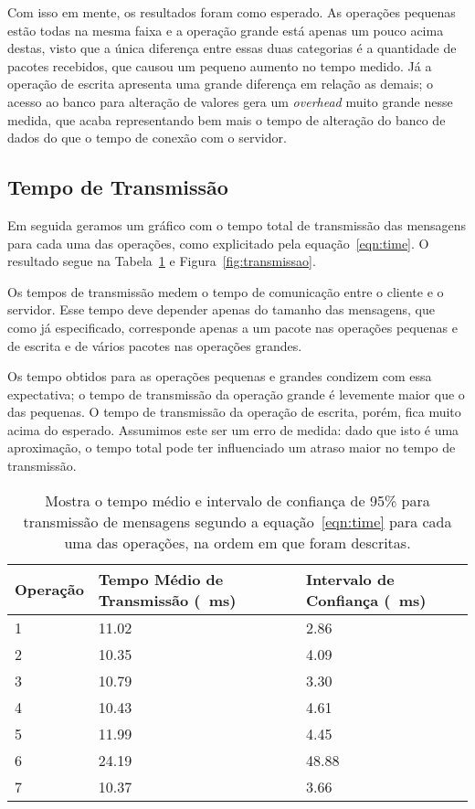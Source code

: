 \documentclass[12pt,a4paper]{article}
\begin{document}
Com isso em mente, os resultados foram como esperado. As operações pequenas estão todas na mesma faixa e a operação grande está apenas um pouco acima destas, visto que a única diferença entre essas duas categorias é a quantidade de pacotes recebidos, que causou um pequeno aumento no tempo medido. Já a operação de escrita apresenta uma grande diferença em relação as demais; o acesso ao banco para alteração de valores gera um {\it overhead} muito grande nesse medida, que acaba representando bem mais o tempo de alteração do banco de dados do que o tempo de conexão com o servidor.

\subsection{Tempo de Transmissão}

Em seguida geramos um gráfico com o tempo total de transmissão das mensagens para cada uma das operações, como explicitado pela equação~\ref{eqn:time}. O resultado segue na Tabela~\ref{table:transmissao} e Figura~\ref{fig:transmissao}.

Os tempos de transmissão medem o tempo de comunicação entre o cliente e o servidor. Esse tempo deve depender apenas do tamanho das mensagens, que como já especificado, corresponde apenas a um pacote nas operações pequenas e de escrita e de vários pacotes nas operações grandes. 

Os tempo obtidos para as operações pequenas e grandes condizem com essa expectativa; o tempo de transmissão da operação grande é levemente maior que o das pequenas. O tempo de transmissão da operação de escrita, porém, fica muito acima do esperado. Assumimos este ser um erro de medida: dado que isto é uma aproximação, o tempo total pode ter influenciado um atraso maior no tempo de transmissão.

\begin{table}[h]
\centering
\caption{Mostra o tempo médio e intervalo de confiança de 95\% para transmissão de mensagens segundo a equação~\ref{eqn:time} para cada uma das operações, na ordem em que foram descritas.}
\label{table:transmissao}
\begin{tabular}{lll}
Operação & Tempo Médio de Transmissão (\SI{}{\milli\second}) & Intervalo de Confiança (\SI{}{\milli\second}) \\ \hline
1        & 11.02                & 2.86   \\
2        & 10.35                & 4.09   \\
3        & 10.79                & 3.30   \\
4        & 10.43                & 4.61   \\
5        & 11.99                & 4.45   \\
6        & 24.19                & 48.88  \\
7        & 10.37                & 3.66  
\end{tabular}
\end{table}
\end{document}
